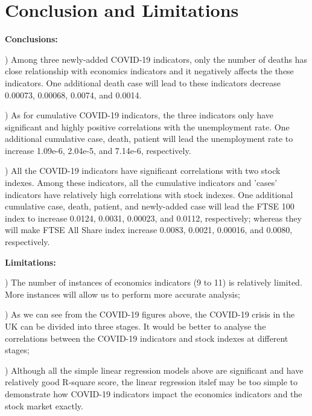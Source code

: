 \documentclass[12pt, a4paper]{report}
\begin{document}
\section{Conclusion and Limitations}
\textbf{Conclusions:}\par
{}) Among three newly-added COVID-19 indicators, only the number of deaths has close
relationship with economics indicators and it negatively affects the these indicators.
One additional death case will lead to these indicators decrease 0.00073, 0.00068, 0.0074, and 0.0014.\par
{}) As for cumulative COVID-19 indicators, the three indicators only have significant and highly positive correlations
with the unemployment rate. One additional cumulative case, death, patient will lead the unemployment rate to increase 1.09e-6, 2.04e-5, and 7.14e-6, respectively.\par
{}) All the COVID-19 indicators have significant correlations with two stock indexes. Among these indicators, all the cumulative indicators and 
'cases' indicators have relatively high correlations with stock indexes. One additional cumulative case, death, patient, and newly-added case will lead the 
FTSE 100 index to increase 0.0124, 0.0031, 0.00023, and 0.0112, respectively; whereas they will make FTSE All Share index increase 0.0083, 0.0021, 0.00016, and 0.0080, 
respectively.\par

\hspace*{\fill}

\noindent
\textbf{Limitations:}\par
{}) The number of instances of economics indicators (9 to 11) is relatively limited. More instances will allow us to perform more accurate analysis;\par
{}) As we can see from the COVID-19 figures above, the COVID-19 crisis in the UK can be divided into three stages. It would be 
better to analyse the correlations between the COVID-19 indicators and stock indexes at different stages;\par
{}) Although all the simple linear regression models above are significant and have relatively good R-square score, the linear regression itslef may be 
too simple to demonstrate how COVID-19 indicators impact the economics indicators and the stock market exactly.\par
\end{document}
